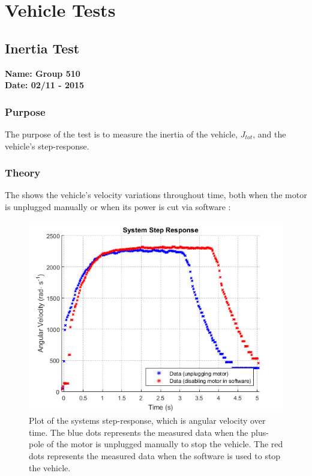\pagebreak
\section{Vehicle Tests}
\nopagebreak

\subsection{Inertia Test} %
\textbf{Name: Group 510}\\
\textbf{Date: 02/11 - 2015}

\subsubsection{Purpose}
The purpose of the test is to measure the inertia of the vehicle, $J_{tot}$, and the vehicle's step-response.

\subsubsection{Theory}
The  shows the vehicle's velocity variations throughout time, both when the motor is unplugged manually or when its power is cut via software :

\begin{figure}[H]
  \centering
  \includegraphics[scale=0.8]{figures/inertiaTestPowerCutOrDisable.png}
  \caption{Plot of the systems step-response, which is angular velocity over time. The blue dots represents the measured data when the plus-pole of the motor is unplugged manually to stop the vehicle. The red dots represents the measured data when the software is used to stop the vehicle.}
  \label{inertiaTestPowerCutOrDisable}
\end{figure}

